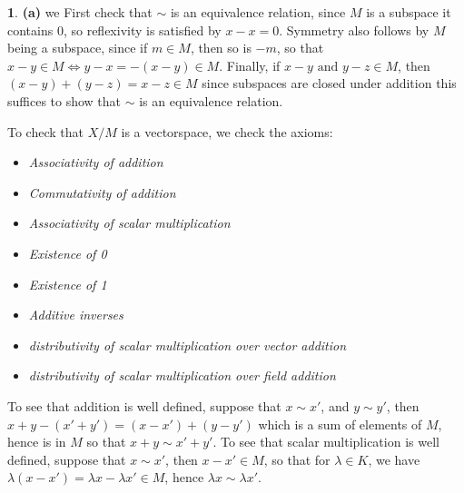 \documentclass[10.5pt]{article}
\theoremstyle{definition}
\newtheorem{pb}{}
\newcommand{\tand}{\text{ and }}
\begin{document}
        \begin{pb}
            \textbf{(a)} we First check that \(\sim\) is an equivalence relation, since \(M\) is a subspace it contains \(0\), so reflexivity is satisfied by \(x-x = 0\). Symmetry also follows by \(M\) being a subspace, since if \(m \in M\), then so is \(-m\), so that \(x-y \in M \iff y-x = -(x-y) \in M\). Finally, if \(x-y \tand y-z \in M\), then \((x-y) + (y-z) = x-z \in M\) since subspaces are closed under addition this suffices to show that \(\sim\) is an equivalence relation.

            To check that \(X/M\) is a vectorspace, we check the axioms:

            \begin{itemize}
                \item \emph{Associativity of addition}
                \item \emph{Commutativity of addition}
                \item \emph{Associativity of scalar multiplication}
                \item \emph{Existence of 0}
                \item \emph{Existence of 1}
                \item \emph{Additive inverses}
                \item \emph{distributivity of scalar multiplication over vector addition}
                \item \emph{distributivity of scalar multiplication over field addition}
            \end{itemize}
            
            To see that addition is well defined, suppose that \(x \sim x'\), and \(y \sim y'\), then \(x + y - (x' + y') = (x - x') + (y-y')\) which is a sum of elements of \(M\), hence is in \(M\) so that \(x + y \sim x' + y'\). To see that scalar multiplication is well defined, suppose that \(x \sim x'\), then \(x - x' \in M\), so that for \(\lambda \in K\), we have \(\lambda(x - x') = \lambda x - \lambda x' \in M\), hence \(\lambda x \sim \lambda x'\).


\end{pb}
\end{document}
